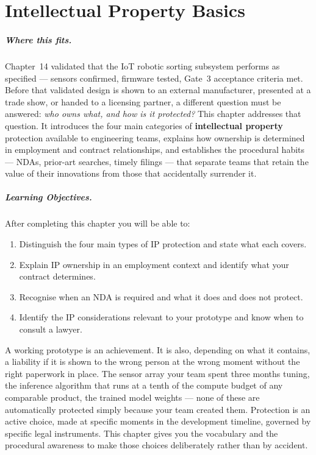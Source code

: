 
\chapter{Intellectual Property Basics}
\label{ch15}

\paragraph{Where this fits.}
Chapter~14 validated that the IoT robotic sorting subsystem performs as specified
--- sensors confirmed, firmware tested, Gate~3 acceptance criteria met.
Before that validated design is shown to an external manufacturer, presented at a
trade show, or handed to a licensing partner, a different question must be
answered: \emph{who owns what, and how is it protected?}
This chapter addresses that question.
It introduces the four main categories of \textbf{intellectual property}
protection available to engineering teams, explains how ownership is determined in
employment and contract relationships, and establishes the procedural habits ---
NDAs, prior-art searches, timely filings --- that separate teams that retain the
value of their innovations from those that accidentally surrender it.

\paragraph{Learning Objectives.}
After completing this chapter you will be able to:
\begin{enumerate}
  \item Distinguish the four main types of IP protection and state what each covers.
  \item Explain IP ownership in an employment context and identify what your contract determines.
  \item Recognise when an NDA is required and what it does and does not protect.
  \item Identify the IP considerations relevant to your prototype and know when to consult a lawyer.
\end{enumerate}

A working prototype is an achievement.
It is also, depending on what it contains, a liability if it is shown to the wrong
person at the wrong moment without the right paperwork in place.
The sensor array your team spent three months tuning, the inference algorithm that
runs at a tenth of the compute budget of any comparable product, the trained model
weights --- none of these are automatically protected simply because your team
created them.
Protection is an active choice, made at specific moments in the development
timeline, governed by specific legal instruments.
This chapter gives you the vocabulary and the procedural awareness to make those
choices deliberately rather than by accident.

